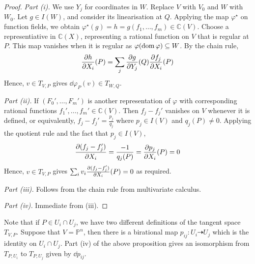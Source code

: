 \begin{proof}
    \emph{Part (i).}
    We use \( Y_j \) for coordinates in \( W \).
    Replace \( V \) with \( V_0 \) and \( W \) with \( W_0 \).
    Let \( g \in I(W) \), and consider its linearisation at \( Q \).
    Applying the map \( \varphi^\star \) on function fields, we obtain \( \varphi^\star(g) = h = g(f_1, \dots, f_m) \in \mathbb C(V) \).
    Choose a representiative in \( \mathbb C(X) \), representing a rational function on \( V \) that is regular at \( P \).
    This map vanishes when it is regular as \( \varphi(\operatorname{dom} \varphi) \subseteq W \).
    By the chain rule,
    \[ \pdv{h}{X_i}\qty(P) = \sum_j \pdv{g}{Y_j}\qty(Q) \pdv{f_j}{X_i}\qty(P) \]
    Hence, \( v \in T_{V,P} \) gives \( \dd{\varphi}_P(v) \in T_{W,Q} \).

    \emph{Part (ii).}
    If \( (F_0', \dots, F_m') \) is another representation of \( \varphi \) with corresponding rational functions \( f_1', \dots, f_m' \in \mathbb C(V) \).
    Then \( f_j - f_j' \) vanishes on \( V \) whenever it is defined, or equivalently, \( f_j - f_j' = \frac{p_j}{q_j} \) where \( p_j \in I(V) \) and \( q_j(P) \neq 0 \).
    Applying the quotient rule and the fact that \( p_j \in I(V) \),
    \[ \pdv{(f_j - f_j')}{X_i} = \frac{-1}{q_j(P)} = \pdv{p_j}{X_i}\qty(P) = 0 \]
    Hence, \( v \in T_{V,P} \) gives \( \sum_i v_i \pdv{(f_j - f_j')}{X_i}\qty(P) = 0 \) as required.

    \emph{Part (iii).}
    Follows from the chain rule from multivariate calculus.

    \emph{Part (iv).}
    Immediate from (iii).
\end{proof}
Note that if \( P \in U_i \cap U_j \), we have two different definitions of the tangent space \( T_{V,P} \).
Suppose that \( V = \mathbb P^n \), then there is a birational map \( p_{ij} \colon U_i \dashrightarrow U_j \) which is the identity on \( U_i \cap U_j \).
Part (iv) of the above proposition gives an isomorphism from \( T_{P,U_i} \) to \( T_{P,U_j} \) given by \( \dd{p}_{ij} \).
